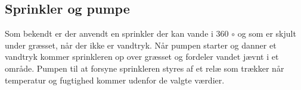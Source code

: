 \subsection{Sprinkler og pumpe}
Som bekendt er der anvendt en sprinkler der kan vande i 360 ${\circ}$ og som er skjult under græsset, når der ikke er vandtryk. Når pumpen starter og danner et vandtryk kommer sprinkleren op over græsset og fordeler vandet jævnt i et område. 
Pumpen til at forsyne sprinkleren styres af et relæ som trækker når temperatur og fugtighed kommer udenfor de valgte værdier.

